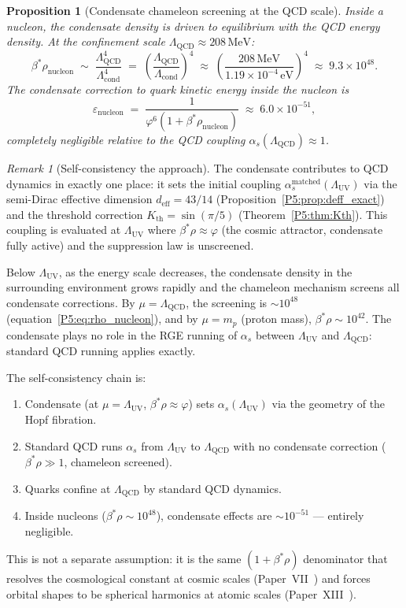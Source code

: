 \documentclass[11pt,a4paper]{article}
\newtheorem{proposition}[theorem]{Proposition}
\theoremstyle{definition}
\theoremstyle{remark}
\newtheorem{remark}[theorem]{Remark}
\newcommand{\vp}{\varphi}
\newcommand{\bst}{\beta^{*}}
\newcommand{\Lcond}{\Lambda_{\mathrm{cond}}}
\newcommand{\LUV}{\Lambda_{\mathrm{UV}}}
\newcommand{\LQCD}{\Lambda_{\mathrm{QCD}}}
\newcommand{\deff}{d_{\mathrm{eff}}}
\begin{document}
\begin{proposition}[Condensate chameleon screening at the QCD scale]
\label{P5:prop:qcd_chameleon}
Inside a nucleon, the condensate density is driven to equilibrium
with the QCD energy density.
At the confinement scale $\LQCD\approx208\,\mathrm{MeV}$:
\begin{equation}
  \bst\rho_{\mathrm{nucleon}}
  \;\sim\; \frac{\LQCD^4}{\Lcond^4}
  \;=\; \left(\frac{\LQCD}{\Lcond}\right)^{\!4}
  \;\approx\; \left(\frac{208\,\mathrm{MeV}}{1.19\times10^{-4}\,\mathrm{eV}}\right)^{\!4}
  \;\approx\; 9.3\times10^{48}.
  \label{P5:eq:rho_nucleon}
\end{equation}
The condensate correction to quark kinetic energy inside the nucleon is
\begin{equation}
  \varepsilon_{\mathrm{nucleon}}
  \;=\; \frac{1}{\vp^6(1+\bst\rho_{\mathrm{nucleon}})}
  \;\approx\; 6.0\times10^{-51},
  \label{P5:eq:eps_nucleon}
\end{equation}
completely negligible relative to the QCD coupling $\alpha_s(\LQCD)\approx1$.
\end{proposition}

\begin{remark}[Self-consistency the approach]
\label{P5:rem:selfconsistency}
The condensate contributes to QCD dynamics in exactly one place:
it sets the initial coupling $\alpha_s^{\mathrm{matched}}(\LUV)$
via the semi-Dirac effective dimension $\deff=43/14$
(Proposition~\ref{P5:prop:deff_exact}) and the threshold correction
$K_{\mathrm{th}}=\sin(\pi/5)$ (Theorem~\ref{P5:thm:Kth}).
This coupling is evaluated at $\LUV$ where $\bst\rho\approx\vp$
(the cosmic attractor, condensate fully active) and the
suppression law is unscreened.

Below $\LUV$, as the energy scale decreases, the condensate
density in the surrounding environment grows rapidly and the
chameleon mechanism screens all condensate corrections.
By $\mu=\LQCD$, the screening is $\sim10^{48}$ (equation~\eqref{P5:eq:rho_nucleon}),
and by $\mu = m_p$ (proton mass), $\bst\rho\sim10^{42}$.
The condensate plays no role in the RGE running of $\alpha_s$
between $\LUV$ and $\LQCD$: standard QCD running applies exactly.

The self-consistency chain is:
\begin{enumerate}[noitemsep]
  \item Condensate (at $\mu=\LUV$, $\bst\rho\approx\vp$) sets
    $\alpha_s(\LUV)$ via the geometry of the Hopf fibration.
  \item Standard QCD runs $\alpha_s$ from $\LUV$ to $\LQCD$
    with no condensate correction ($\bst\rho\gg1$, chameleon screened).
  \item Quarks confine at $\LQCD$ by standard QCD dynamics.
  \item Inside nucleons ($\bst\rho\sim10^{48}$), condensate effects
    are $\sim10^{-51}$ --- entirely negligible.
\end{enumerate}
This is not a separate assumption: it is the same $(1+\bst\rho)$
denominator that resolves the cosmological constant at cosmic scales
(Paper~VII~\cite{Paper7}) and forces orbital shapes to be spherical
harmonics at atomic scales (Paper~XIII~\cite{Paper13}).
\end{remark}
\end{document}

